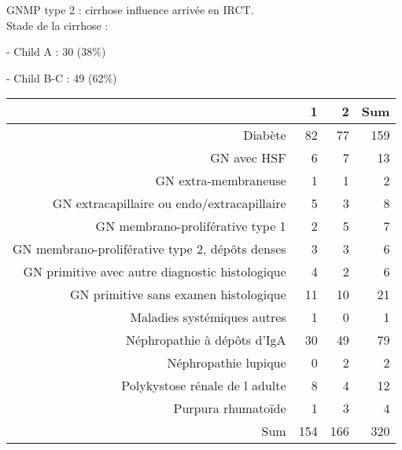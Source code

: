 \documentclass[11pt,a4paper]{article}\usepackage[]{graphicx}\usepackage[]{color}
\begin{document}
GNMP type 2 : cirrhose influence arrivée en IRCT.
~\\

Stade de la cirrhose :

- Child A : 30 (38\%)

- Child B-C : 49 (62\%)

\begin{table}[H]
\centering
\begin{tabular}{rrrr}
  \hline
 & 1 & 2 & Sum \\ 
  \hline
Diabète & 82 & 77 & 159 \\ 
  GN avec HSF & 6 & 7 & 13 \\ 
  GN extra-membraneuse & 1 & 1 & 2 \\ 
  GN extracapillaire ou endo/extracapillaire & 5 & 3 & 8 \\ 
  GN membrano-proliférative type 1 & 2 & 5 & 7 \\ 
  GN membrano-proliférative type 2, dépôts denses & 3 & 3 & 6 \\ 
  GN primitive avec autre diagnostic histologique & 4 & 2 & 6 \\ 
  GN primitive sans examen histologique & 11 & 10 & 21 \\ 
  Maladies systémiques autres & 1 & 0 & 1 \\ 
  Néphropathie à dépôts d'IgA & 30 & 49 & 79 \\ 
  Néphropathie lupique & 0 & 2 & 2 \\ 
  Polykystose rénale de l adulte & 8 & 4 & 12 \\ 
  Purpura rhumatoïde & 1 & 3 & 4 \\ 
  Sum & 154 & 166 & 320 \\ 
   \hline
\end{tabular}
\end{table}
\end{document}

